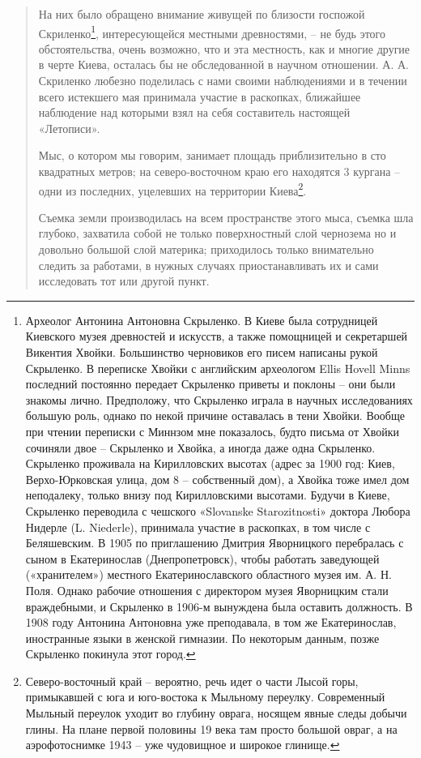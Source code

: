 \begin{quotation}
На них было обращено внимание живущей по близости госпожой Скриленко\footnote{Археолог Антонина Антоновна Скрыленко. В Киеве была сотрудницей Киевского музея древностей и искусств, а также помощницей и секретаршей Викентия Хвойки. Большинство черновиков его писем написаны рукой Скрыленко. В переписке Хвойки с английским археологом Ellis Hovell Minns последний постоянно передает Скрыленко приветы и поклоны – они были знакомы лично. Предположу, что Скрыленко играла в научных исследованиях большую роль, однако по некой причине оставалась в тени Хвойки. Вообще при чтении переписки с Миннзом мне показалось, будто письма от Хвойки сочиняли двое – Скрыленко и Хвойка, а иногда даже одна Скрыленко. Скрыленко проживала на Кирилловских высотах (адрес за 1900 год: Киев, Верхо-Юрковская улица, дом 8 – собственный дом), а Хвойка тоже имел дом неподалеку, только внизу под Кирилловскими высотами. Будучи в Киеве, Скрыленко переводила с чешского «Slovanske Starozitnosti» доктора Любора Нидерле (L. Niederle), принимала участие в раскопках, в том числе с Беляшевским. В 1905 по приглашению Дмитрия Яворницкого перебралась с сыном в Екатеринослав (Днепропетровск), чтобы работать заведующей («хранителем») местного Екатеринославского областного музея им. А. Н. Поля. Однако рабочие отношения с директором музея Яворницким стали враждебными, и Скрыленко в 1906-м вынуждена была оставить должность. В 1908 году Антонина Антоновна уже преподавала, в том же Екатеринослав, иностранные языки в женской гимназии. По некоторым данным, позже Скрыленко покинула этот город.}, интересующейся местными древностями, – не будь этого обстоятельства, очень возможно, что и эта местность, как и многие другие в черте Киева, осталась бы не обследованной в научном отношении. А. А. Скриленко любезно поделилась с нами своими наблюдениями и в течении всего истекшего мая принимала участие в раскопках, ближайшее наблюдение над которыми взял на себя составитель настоящей «Летописи».

Мыс, о котором мы говорим, занимает площадь приблизительно в сто квадратных метров; на северо-восточном краю его находятся 3 кургана – одни из последних, уцелевших на территории Киева\footnote{Северо-восточный край – вероятно, речь идет о части Лысой горы, примыкавшей с юга и юго-востока к Мыльному переулку. Современный Мыльный переулок уходит во глубину оврага, носящем явные следы добычи глины. На плане первой половины 19 века там просто большой овраг, а на аэрофотоснимке 1943 – уже чудовищное и широкое глинище.}.

Съемка земли производилась на всем пространстве этого мыса, съемка шла глубоко, захватила собой не только поверхностный слой чернозема но и довольно большой слой материка; приходилось только внимательно следить за работами, в нужных случаях приостанавливать их и сами исследовать тот или другой пункт.


\end{quotation}
